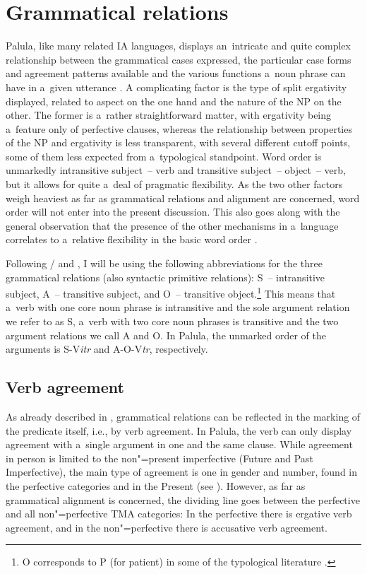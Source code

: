 \chapter{Grammatical relations}
\label{chap:11}

Palula, like many related IA languages, displays an~intricate and quite complex relationship between the grammatical cases expressed, the particular case forms and agreement patterns available and the various functions a~noun phrase can have in a~given utterance \citep[230--231]{masica1991}. A complicating factor is the type of split ergativity displayed, related to aspect on the one hand and the nature of the NP on the other. The former is a~rather straightforward matter, with ergativity being a~feature only of perfective clauses, whereas the relationship between properties of the NP and ergativity is less transparent, with several different cutoff points, some of them less expected from a~typological standpoint. Word order is unmarkedly intransitive subject~-- verb and transitive subject~-- object~-- verb, but it allows for quite a~deal of pragmatic flexibility. As the two other factors weigh heaviest as far as grammatical relations and alignment are concerned, word order will not enter into the present discussion. This also goes along with the general observation that the presence of the other mechanisms in a~language correlates to a~relative flexibility in the basic word order \citep[14--15]{blake2001}.



Following \citet[6--8]{dixon1994}/\citet[76--77]{dixon2010} and \citet[402]{bickel2011}, I will be using the following abbreviations for the three grammatical relations (also syntactic primitive relations): S~-- intransitive subject, A~-- transitive subject, and O~-- transitive object.\footnote{O corresponds to P (for patient) in some of the typological literature \citep{comrie1989,croft2003}.\par } This means that a~verb with one core noun phrase is intransitive and the sole argument relation we refer to as S, a~verb with two core noun phrases is transitive and the two argument relations we call A and O. In Palula, the unmarked order of the arguments is S-V\textit{itr} and A-O-V\textit{tr}, respectively.


\section{Verb agreement}
\label{sec:11-1}

As already described in , grammatical relations can be reflected in the marking of the predicate itself, i.e., by verb agreement. In Palula, the verb can only display agreement with a~single argument in one and the same clause. While agreement in person is limited to the non"=present imperfective (Future and Past Imperfective), the main type of agreement is one in gender and number, found in the perfective categories and in the Present (see ). However, as far as grammatical alignment is concerned, the dividing line goes between the perfective and all non"=perfective TMA categories: In the perfective there is ergative verb agreement, and in the non"=perfective there is accusative verb agreement. 


